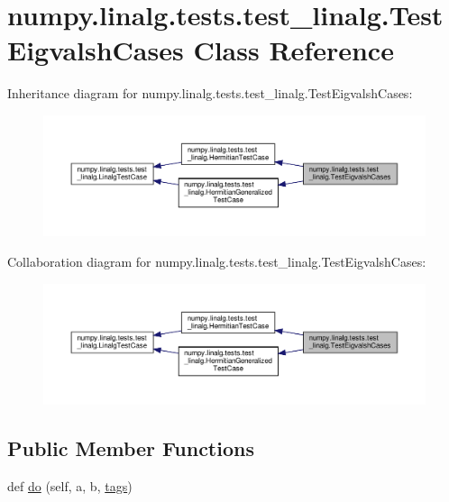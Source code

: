 \hypertarget{classnumpy_1_1linalg_1_1tests_1_1test__linalg_1_1TestEigvalshCases}{}\section{numpy.\+linalg.\+tests.\+test\+\_\+linalg.\+Test\+Eigvalsh\+Cases Class Reference}
\label{classnumpy_1_1linalg_1_1tests_1_1test__linalg_1_1TestEigvalshCases}


Inheritance diagram for numpy.\+linalg.\+tests.\+test\+\_\+linalg.\+Test\+Eigvalsh\+Cases\+:
\nopagebreak
\begin{figure}[H]
\begin{center}
\leavevmode
\includegraphics[width=350pt]{classnumpy_1_1linalg_1_1tests_1_1test__linalg_1_1TestEigvalshCases__inherit__graph}
\end{center}
\end{figure}


Collaboration diagram for numpy.\+linalg.\+tests.\+test\+\_\+linalg.\+Test\+Eigvalsh\+Cases\+:
\nopagebreak
\begin{figure}[H]
\begin{center}
\leavevmode
\includegraphics[width=350pt]{classnumpy_1_1linalg_1_1tests_1_1test__linalg_1_1TestEigvalshCases__coll__graph}
\end{center}
\end{figure}
\subsection*{Public Member Functions}
\begin{DoxyCompactItemize}
\item 
def \hyperlink{classnumpy_1_1linalg_1_1tests_1_1test__linalg_1_1TestEigvalshCases_a90a68fccd7fcb0a4af5be867e5952735}{do} (self, a, b, \hyperlink{namespacenumpy_1_1linalg_1_1tests_1_1test__linalg_ac6a064918e74d701a7b5aac0ffefe1e7}{tags})
\end{DoxyCompactItemize}
